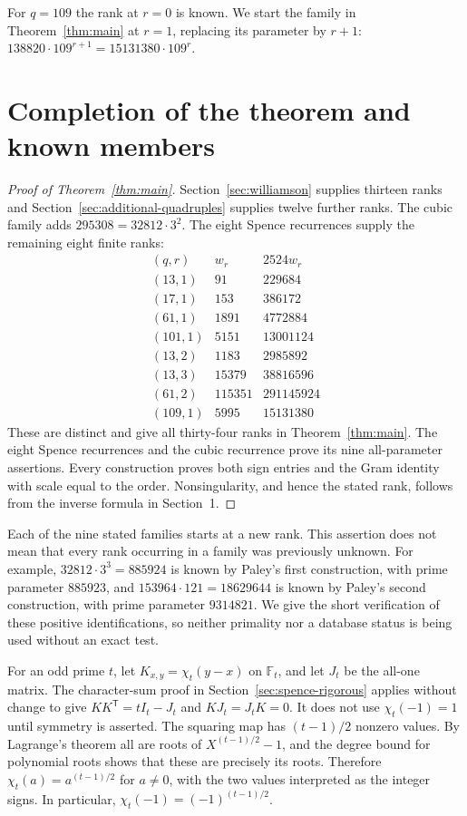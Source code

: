 \documentclass[10pt]{article}
\newcommand{\F}{\mathbb F}
\begin{document}
For $q=109$ the rank at $r=0$ is known. We start the family in
Theorem~\ref{thm:main} at $r=1$, replacing its parameter by $r+1$:
$138820\cdot109^{r+1}=15131380\cdot109^r$.

\section{Completion of the theorem and known members}\label{sec:conclusion}

\begin{proof}[Proof of Theorem~\ref{thm:main}]
Section~\ref{sec:williamson} supplies thirteen ranks and
Section~\ref{sec:additional-quadruples} supplies twelve further ranks.
The cubic family adds $295308=32812\cdot3^2$.
The eight Spence recurrences supply the remaining eight finite ranks:
\[
\begin{array}{c|r|r}
(q,r)&w_r&2524w_r\\\hline
(13,1)&91&229684\\
(17,1)&153&386172\\
(61,1)&1891&4772884\\
(101,1)&5151&13001124\\
(13,2)&1183&2985892\\
(13,3)&15379&38816596\\
(61,2)&115351&291145924\\
(109,1)&5995&15131380
\end{array}
\]
These are distinct and give all thirty-four ranks in
Theorem~\ref{thm:main}. The eight Spence recurrences and the cubic
recurrence prove its nine all-parameter assertions.
Every construction proves both sign entries and the Gram identity
with scale equal to the order. Nonsingularity, and hence the stated
rank, follows from the inverse formula in Section~1.
\end{proof}

Each of the nine stated families starts at a new rank. This assertion does not
mean that every rank occurring in a family was previously unknown.
For example, $32812\cdot3^3=885924$ is known by Paley's first construction,
with prime parameter $885923$, and
$153964\cdot121=18629644$ is known by Paley's second construction,
with prime parameter $9314821$. We give the short verification of these
positive identifications, so neither primality nor a database status is
being used without an exact test.

For an odd prime $t$, let $K_{x,y}=\chi_t(y-x)$ on $\F_t$, and let
$J_t$ be the all-one matrix. The character-sum proof in
Section~\ref{sec:spence-rigorous} applies without change to give
$KK^{\mathsf T}=tI_t-J_t$ and $KJ_t=J_tK=0$.
It does not use $\chi_t(-1)=1$ until symmetry is asserted.
The squaring map has $(t-1)/2$ nonzero values. By Lagrange's theorem
all are roots of $X^{(t-1)/2}-1$, and the degree bound for polynomial
roots shows that these are precisely its roots. Therefore
$\chi_t(a)=a^{(t-1)/2}$ for $a\ne0$, with the two values interpreted
as the integer signs. In particular,
$\chi_t(-1)=(-1)^{(t-1)/2}$.
\end{document}
